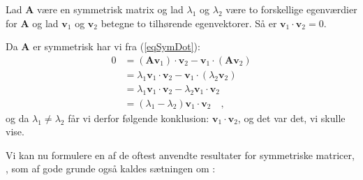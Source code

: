 \begin{theorem} \label{thmForskEgenval}
Lad $\mathbf{A}$ være en symmetrisk matrix og lad $\lambda_{1}$ og $\lambda_{2}$ være to forskellige egenværdier for
$\mathbf{A}$ og lad $\mathbf{v}_{1}$ og $\mathbf{v}_{2}$ betegne to tilhørende egenvektorer. Så er $\mathbf{v}_{1} \cdot \mathbf{v}_{2} = 0$.
\end{theorem}
\begin{bevis}
Da $\mathbf{A}$ er symmetrisk har vi fra (\ref{eqSymDot}):
\begin{equation}
\begin{aligned}
0 &= \left(\mathbf{A}\mathbf{v}_{1}\right)\cdot \mathbf{v}_{2} - \mathbf{v}_{1}\cdot\left(\mathbf{A}\mathbf{v}_{2}\right) \\
&= \lambda_{1}\mathbf{v}_{1}\cdot \mathbf{v}_{2} - \mathbf{v}_{1}\cdot \left(\lambda_{2}\mathbf{v}_{2}\right) \\
&= \lambda_{1}\mathbf{v}_{1}\cdot \mathbf{v}_{2} - \lambda_{2}\mathbf{v}_{1}\cdot \mathbf{v}_{2} \\
&= \left(\lambda_{1} - \lambda_{2}\right)\mathbf{v}_{1}\cdot\mathbf{v}_{2} \quad ,
\end{aligned}
\end{equation}
og da $\lambda_{1} \neq \lambda_{2}$ får vi derfor følgende konklusion: $\mathbf{v}_{1}\cdot\mathbf{v}_{2}$, og det var det, vi skulle vise.
\end{bevis}


Vi kan nu formulere en af de oftest anvendte resultater for symmetriske matricer, , som af gode grunde også kaldes sætningen om :

